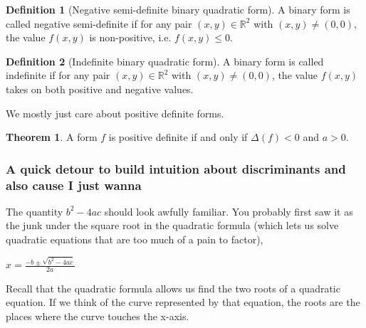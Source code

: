 \documentclass{article}
\theoremstyle{definition}
\newtheorem{definition}{Definition}[section]
\theoremstyle{theorem}
\newtheorem{theorem}{Theorem}[section]
\theoremstyle{example}
\theoremstyle{corollary}
\begin{document}
\bigskip

\theoremstyle{definition}
\begin{definition}[Negative semi-definite binary quadratic form]
A binary form is called negative semi-definite if for any pair \((x, y) \in \mathbb{R}^{2}\) with \((x, y) \ne (0, 0)\), the value \(f(x, y)\) is non-positive, i.e. \(f(x, y) \le 0\).
\end{definition}

\bigskip

\theoremstyle{definition}
\begin{definition}[Indefinite binary quadratic form]
A binary form is called indefinite if for any pair \((x, y) \in \mathbb{R}^{2}\) with \((x, y) \ne (0, 0)\), the value \(f(x, y)\) takes on both positive and negative values.
\end{definition}

\bigskip

We mostly just care about positive definite forms.

\bigskip

\theoremstyle{theorem}
\begin{theorem}
A form \(f\) is positive definite if and only if \(\Delta(f) < 0\) and \(a > 0\).
\end{theorem}

\bigskip







\bigskip

\subsubsection{A quick detour to build intuition about discriminants and also cause I just wanna}

\bigskip

The quantity \(b^{2} - 4ac\) should look awfully familiar. You probably first saw it as the junk under the square root in the quadratic formula (which lets us solve quadratic equations that are too much of a pain to factor),
\begin{center}
\(x = \frac{-b \pm \sqrt{b^{2} - 4ac}}{2a}\)
\end{center}

\bigskip

Recall that the quadratic formula allows us find the two roots of a quadratic equation. If we think of the curve represented by that equation, the roots are the places where the curve touches the x-axis.
\end{document}
